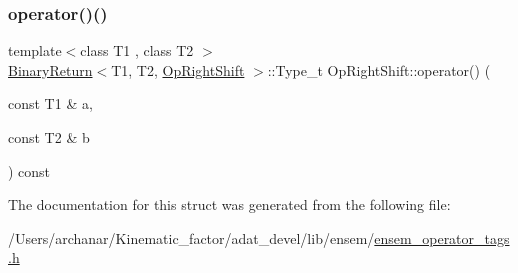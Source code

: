 \mbox{\label{structOpRightShift_a8b6b10211df9e2bcb0e8ce90458f12b8}} 
\subsubsection{\texorpdfstring{operator()()}{operator()()}\hspace{0.1cm}{\footnotesize\ttfamily [2/2]}}
{\footnotesize\ttfamily template$<$class T1 , class T2 $>$ \\
\mbox{\hyperlink{structBinaryReturn}{Binary\+Return}}$<$T1, T2, \mbox{\hyperlink{structOpRightShift}{Op\+Right\+Shift}} $>$\+::Type\+\_\+t Op\+Right\+Shift\+::operator() (\begin{DoxyParamCaption}\item[{const T1 \&}]{a,  }\item[{const T2 \&}]{b }\end{DoxyParamCaption}) const\hspace{0.3cm}{\ttfamily [inline]}}



The documentation for this struct was generated from the following file\+:\begin{DoxyCompactItemize}
\item 
/\+Users/archanar/\+Kinematic\+\_\+factor/adat\+\_\+devel/lib/ensem/\mbox{\hyperlink{lib_2ensem_2ensem__operator__tags_8h}{ensem\+\_\+operator\+\_\+tags.\+h}}\end{DoxyCompactItemize}
